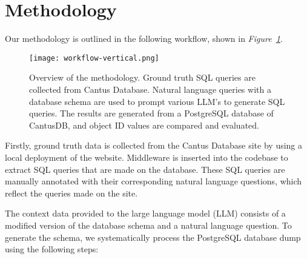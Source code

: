\section{Methodology}




Our methodology is outlined in the following workflow, shown in \textit{Figure~\ref{fig:methods-overview}}.


\begin{figure}[h!]
    \centering
    \texttt{[image: workflow-vertical.png]} %
    \caption{Overview of the methodology. Ground truth SQL queries are collected from Cantus Database. Natural language queries with a database schema are used to prompt various LLM's to generate SQL queries. The results are generated from a PostgreSQL database of CantusDB, and object ID values are compared and evaluated.}
    \label{fig:methods-overview} %
\end{figure}

Firstly, ground truth data is collected from the Cantus Database site by using a local deployment of the website. Middleware is inserted into the codebase to extract SQL queries that are made on the database. These SQL queries are manually annotated with their corresponding natural language questions, which reflect the queries made on the site.

The context data provided to the large language model (LLM) consists of a modified version of the database schema and a natural language question. To generate the schema, we systematically process the PostgreSQL database dump using the following steps:

